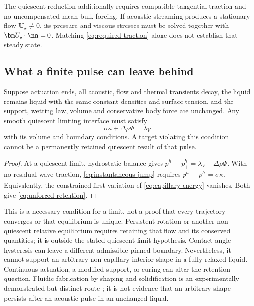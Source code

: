 The quiescent reduction additionally requires compatible tangential traction
and no uncompensated mean bulk forcing. If acoustic streaming produces a
stationary flow $\bm U_\star\ne0$, its pressure and viscous stresses must be
solved together with $\bm U_\star\cdot\nn=0$. Matching
\cref{eq:required-traction} alone does not establish that steady state.

\subsection{What a finite pulse can leave behind}
\begin{proposition}
Suppose actuation ends, all acoustic, flow and thermal transients decay, the
liquid remains liquid with the same constant densities and surface tension,
and the support, wetting law, volume and conservative body force are unchanged.
Any smooth quiescent limiting interface must satisfy
\begin{equation}
 \sigma\kappa+\Delta\rho\Phi=\lambda_V
 \label{eq:unforced-retention}
\end{equation}
with its volume and boundary conditions. A target violating this condition
cannot be a permanently retained quiescent result of that pulse.
\end{proposition}
\begin{proof}
At a quiescent limit, hydrostatic balance gives
$p^h_- -p^h_+=\lambda_V-\Delta\rho\Phi$. With no residual wave traction,
\cref{eq:instantaneous-jump} requires $p^h_- -p^h_+=\sigma\kappa$.
Equivalently, the constrained first variation of \cref{eq:capillary-energy}
vanishes. Both give \cref{eq:unforced-retention}.
\end{proof}
This is a necessary condition for a limit, not a proof that every trajectory
converges or that equilibrium is unique. Persistent rotation or another
non-quiescent relative equilibrium requires retaining that flow and its
conserved quantities; it is outside the stated quiescent-limit hypothesis.
Contact-angle hysteresis can leave a
different admissible pinned boundary. Nevertheless, it cannot support an
arbitrary non-capillary interior shape in a fully relaxed liquid. Continuous
actuation, a modified support, or curing can alter the retention question.
Fluidic fabrication by shaping and solidification is an experimentally
demonstrated but distinct route \cite{elgarisi2021}; it is not evidence that
an arbitrary shape persists after an acoustic pulse in an unchanged liquid.
